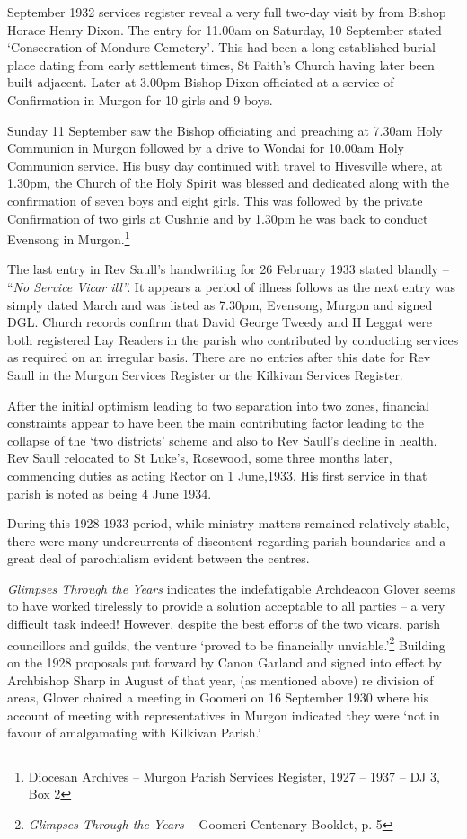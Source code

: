 September 1932 services register reveal a very full two-day visit by
from Bishop Horace Henry Dixon. The entry for 11.00am on Saturday, 10
September stated `Consecration of Mondure Cemetery'\emph{.} This had
been a long-established burial place dating from early settlement times,
St Faith's Church having later been built adjacent. Later at 3.00pm
Bishop Dixon officiated at a service of Confirmation in Murgon for 10
girls and 9 boys.

Sunday 11 September saw the Bishop officiating and preaching at 7.30am
Holy Communion in Murgon followed by a drive to Wondai for 10.00am Holy
Communion service. His busy day continued with travel to Hivesville
where, at 1.30pm, the Church of the Holy Spirit was blessed and
dedicated along with the confirmation of seven boys and eight girls.
This was followed by the private Confirmation of two girls at Cushnie
and by 1.30pm he was back to conduct Evensong in Murgon.\footnote{Diocesan
  Archives -- Murgon Parish Services Register, 1927 -- 1937 -- DJ 3, Box
  2}

The last entry in Rev Saull's handwriting for 26 February 1933 stated
blandly -- ``\emph{No Service Vicar ill''.} It appears a period of
illness follows as the next entry was simply dated March and was listed
as 7.30pm, Evensong, Murgon and signed DGL. Church records confirm that
David George Tweedy and H Leggat were both registered Lay Readers in the
parish who contributed by conducting services as required on an
irregular basis. There are no entries after this date for Rev Saull in
the Murgon Services Register or the Kilkivan Services Register.

After the initial optimism leading to two separation into two zones,
financial constraints appear to have been the main contributing factor
leading to the collapse of the `two districts' scheme and also to Rev
Saull's decline in health. Rev Saull relocated to St Luke's, Rosewood,
some three months later, commencing duties as acting Rector on 1
June,1933. His first service in that parish is noted as being 4 June
1934.

During this 1928-1933 period, while ministry matters remained relatively
stable, there were many undercurrents of discontent regarding parish
boundaries and a great deal of parochialism evident between the centres.

\emph{Glimpses Through the Years} indicates the indefatigable Archdeacon
Glover seems to have worked tirelessly to provide a solution acceptable
to all parties -- a very difficult task indeed! However, despite the
best efforts of the two vicars, parish councillors and guilds, the
venture `proved to be financially unviable.'\footnote{\emph{Glimpses
  Through the Years --} Goomeri Centenary Booklet, p. 5} Building on the
1928 proposals put forward by Canon Garland and signed into effect by
Archbishop Sharp in August of that year, (as mentioned above) re
division of areas, Glover chaired a meeting in Goomeri on 16 September
1930 where his account of meeting with representatives in Murgon
indicated they were `not in favour of amalgamating with Kilkivan
Parish.'

